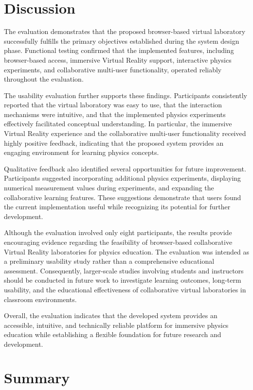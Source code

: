 \section{Discussion}

The evaluation demonstrates that the proposed browser-based virtual laboratory successfully fulfills the primary objectives established during the system design phase. Functional testing confirmed that the implemented features, including browser-based access, immersive Virtual Reality support, interactive physics experiments, and collaborative multi-user functionality, operated reliably throughout the evaluation.

The usability evaluation further supports these findings. Participants consistently reported that the virtual laboratory was easy to use, that the interaction mechanisms were intuitive, and that the implemented physics experiments effectively facilitated conceptual understanding. In particular, the immersive Virtual Reality experience and the collaborative multi-user functionality received highly positive feedback, indicating that the proposed system provides an engaging environment for learning physics concepts.

Qualitative feedback also identified several opportunities for future improvement. Participants suggested incorporating additional physics experiments, displaying numerical measurement values during experiments, and expanding the collaborative learning features. These suggestions demonstrate that users found the current implementation useful while recognizing its potential for further development.

Although the evaluation involved only eight participants, the results provide encouraging evidence regarding the feasibility of browser-based collaborative Virtual Reality laboratories for physics education. The evaluation was intended as a preliminary usability study rather than a comprehensive educational assessment. Consequently, larger-scale studies involving students and instructors should be conducted in future work to investigate learning outcomes, long-term usability, and the educational effectiveness of collaborative virtual laboratories in classroom environments.

Overall, the evaluation indicates that the developed system provides an accessible, intuitive, and technically reliable platform for immersive physics education while establishing a flexible foundation for future research and development.


\section{Summary}

